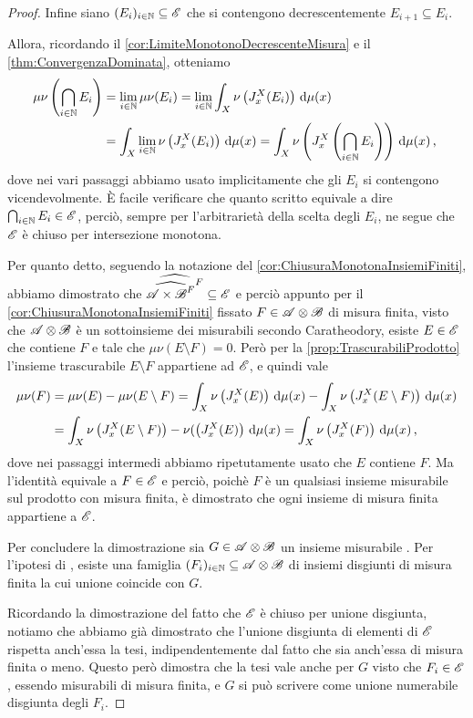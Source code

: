 \begin{proof}
	Infine siano $(E_i)_{i\in\mathbb N}\subseteq \mathscr E$ che si contengono decrescentemente $E_{i+1}\subseteq E_i$.
	
	Allora, ricordando il \cref{cor:LimiteMonotonoDecrescenteMisura} e il \cref{thm:ConvergenzaDominata}, otteniamo
	\begin{align*}
		\mu\nu\left(\bigcap_{i\in\mathbb N}E_i\right)&=\lim_{i\in\mathbb N}\mu\nu(E_i)=
		\lim_{i\in\mathbb N}\int_X\nu\left(J_x^X(E_i)\right)\,\mathrm d\mu(x)\\
		&=\int_X\lim_{i\in\mathbb N}\nu\left(J_x^X(E_i)\right)\,\mathrm d\mu(x)=
		\int_X\nu\left(J_x^X\left(\bigcap_{i\in\mathbb N}E_i\right)\right)\,\mathrm d\mu(x)\, \text{, }
	\end{align*}
	dove nei vari passaggi abbiamo usato implicitamente che gli $E_i$ si contengono vicendevolmente.
	È facile verificare che quanto scritto equivale a dire $\bigcap_{i\in\mathbb N}E_i\in\mathscr E$, perciò, sempre per l'arbitrarietà della scelta degli $E_i$, ne segue che $\mathscr E$ è chiuso per intersezione monotona.
	
	Per quanto detto, seguendo la notazione del \cref{cor:ChiusuraMonotonaInsiemiFiniti}, abbiamo dimostrato che $\widehat{\widehat{{\mathscr A\times\mathscr B}^F}^F}\subseteq\mathscr E$ e perciò appunto per il \cref{cor:ChiusuraMonotonaInsiemiFiniti} fissato $F\in\mathscr A\otimes\mathscr B$ di misura finita, visto che $\mathscr A\otimes\mathscr B$ è un sottoinsieme dei misurabili secondo Caratheodory, esiste $E\in\mathscr E$ che contiene $F$ e tale che $\mu\nu(E\setminus F)=0$. 
	Però per la \cref{prop:TrascurabiliProdotto} l'insieme trascurabile $E\setminus F$ appartiene ad $\mathscr E$, e quindi vale
	\begin{align*}
		\mu\nu(F)&=\mu\nu(E)-\mu\nu(E\setminus F)=\int_X\nu\left(J_x^X(E)\right)\,\mathrm d\mu(x)-\int_X\nu\left(J_x^X(E\setminus F)\right)\,\mathrm d\mu(x)\\
		&=\int_X\nu\left(J_x^X(E\setminus F)\right)-\nu(\left(J_x^X(E)\right)\,\mathrm d\mu(x)
		=\int_X\nu\left(J_x^X(F)\right)\,\mathrm d\mu(x)\, \text{, }
	\end{align*}
	dove nei passaggi intermedi abbiamo ripetutamente usato che $E$ contiene $F$.
	Ma l'identità equivale a $F\in\mathscr E$ e perciò, poichè $F$ è un qualsiasi insieme misurabile sul prodotto con misura finita, è dimostrato che ogni insieme di misura finita appartiene a $\mathscr E$.
	
	Per concludere la dimostrazione sia $G\in\mathscr A\otimes\mathscr B$ un insieme misurabile \sigfin[o]. Per l'ipotesi di \sigfin[ezza], esiste una famiglia $(F_i)_{i\in\mathbb N}\subseteq \mathscr A\otimes\mathscr B$ di insiemi disgiunti di misura finita la cui unione coincide con $G$.
	
	Ricordando la dimostrazione del fatto che $\mathscr E$ è chiuso per unione disgiunta, notiamo che abbiamo già dimostrato che l'unione disgiunta di elementi di $\mathscr E$ rispetta anch'essa la tesi, indipendentemente dal fatto che sia anch'essa di misura finita o meno. Questo però dimostra che la tesi vale anche per $G$ visto che $F_i\in\mathscr E$, essendo misurabili di misura finita, e $G$ si può scrivere come unione numerabile disgiunta degli $F_i$. 
\end{proof}

